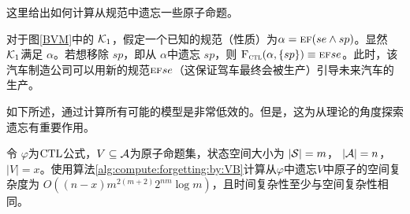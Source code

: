 这里给出如何计算从规范中遗忘一些原子命题。
\begin{example}\label{ex:6}
	对于图\ref{BVM}中的 ${\cal K}_1$，假定一个已知的规范（性质）为$\alpha = \textsc{e}\textsc{f}(se \wedge sp)$。显然 ${\cal K}_1$满足 $\alpha$。若想移除 $sp$，即从 $\alpha$中遗忘 $sp$，则 ${\textsc{F}_{\textsc{ctl}}}(\alpha,\{ sp\}) \equiv \textsc{e}\textsc{f} se$。此时，该汽车制造公司可以用新的规范$\textsc{e}\textsc{f} se$（这保证驾车最终会被生产）引导未来汽车的生产。
\end{example}


如下所述，通过计算所有可能的模型是非常低效的。但是，这为从理论的角度探索遗忘有重要作用。


\begin{proposition}\label{pro:time:alg1}
	令 $\varphi$为$\textrm{CTL}$公式，$V\subseteq {\cal A}$为原子命题集，状态空间大小为 $|{\cal S}|=m$， $|{\cal A}|=n$，$|V|=x$。使用算法\ref{alg:compute:forgetting:by:VB}计算从$\varphi$中遗忘$V$中原子的空间复杂度为 $O((n-x)m^{2(m+2)}2^{nm}  \log m)$，且时间复杂性至少与空间复杂性相同。
\end{proposition}
